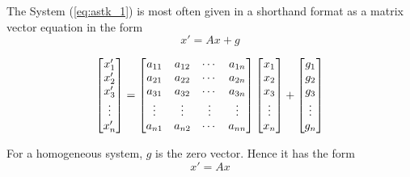 \documentclass[12pt]{report}
\newcommand{\sps}{\\[0.2cm]}
\newcommand{\refn}[1]{(\ref{#1})}
\newcommand{\refx}[1]{\refn{eq:#1}}
\newcommand{\NI}{\noindent}
\newcommand{\sprime}{'}
\begin{document}
	\NI The System \refx{astk_1} is most often given in a shorthand format as a matrix vector equation in the form
	\begin{equation*}
		x\sprime = Ax + g
	\end{equation*}
	
	\begin{equation*}
		\begin{bmatrix}
		x_1\sprime \\
		x_2\sprime \\
		x_3\sprime \\
		\vdots\\
		x_n\sprime
		\end{bmatrix}
		=
		\begin{bmatrix}
			a_{11} & a_{12} & \cdots & a_{1n}\\
			a_{21} & a_{22} & \cdots & a_{2n}\\
			a_{31} & a_{32} & \cdots & a_{3n}\\
			\vdots & \vdots & \vdots & \vdots \\
			a_{n1} & a_{n2} & \cdots & a_{nn}\\
		\end{bmatrix}
		\begin{bmatrix}
			x_1 \\
			x_2 \\
			x_3 \\
			\vdots\\
			x_n
		\end{bmatrix}
		+
		\begin{bmatrix}
			g_1 \\
			g_2 \\
			g_3 \\
			\vdots\\
			g_n
		\end{bmatrix}\sps
	\end{equation*}
	
	\NI For a homogeneous system, $g$ is the zero vector. Hence it has the form
	\begin{equation*}
		x\sprime = Ax
	\end{equation*}
	
\end{document}
